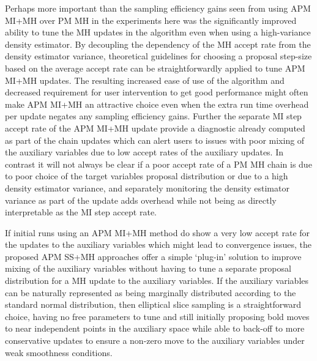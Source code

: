 Perhaps more important than the sampling efficiency gains seen from using \ac{APM} \ac{MI}+\ac{MH} over \ac{PM} \ac{MH} in the experiments here was the significantly improved ability to tune the \ac{MH} updates in the algorithm even when using a high-variance density estimator. By decoupling the dependency of the \ac{MH} accept rate from the density estimator variance, theoretical guidelines for choosing a proposal step-size based on the average accept rate can be straightforwardly applied to tune \ac{APM} \ac{MI}+\ac{MH} updates. The resulting increased ease of use of the algorithm and decreased requirement for user intervention to get good performance might often make \ac{APM} \ac{MI}+\ac{MH} an attractive choice even when the extra run time overhead per update negates any sampling efficiency gains. Further the separate \ac{MI} step accept rate of the \ac{APM} \ac{MI}+\ac{MH} update provide a diagnostic already computed as part of the chain updates which can alert users to issues with poor mixing of the auxiliary variables due to low accept rates of the auxiliary updates. In contrast it will not always be clear if a poor accept rate of a \ac{PM} \ac{MH} chain is due to poor choice of the target variables proposal distribution or due to a high density estimator variance, and separately monitoring the density estimator variance as part of the update adds overhead while not being as directly interpretable as the \ac{MI} step accept rate.

If initial runs using an \ac{APM} \ac{MI}+\ac{MH} method do show a very low accept rate for the updates to the auxiliary variables which might lead to convergence issues, the proposed \ac{APM} \ac{SS}+\ac{MH} approaches offer a simple `plug-in' solution to improve mixing of the auxiliary variables without having to tune a separate proposal distribution for a \ac{MH} update to the auxiliary variables. If the auxiliary variables can be naturally represented as being marginally distributed according to the standard normal distribution, then elliptical slice sampling is a straightforward choice, having no free parameters to tune and still initially proposing bold moves to near independent points in the auxiliary space while able to back-off to more conservative updates to ensure a non-zero move to the auxiliary variables under weak smoothness conditions. 

